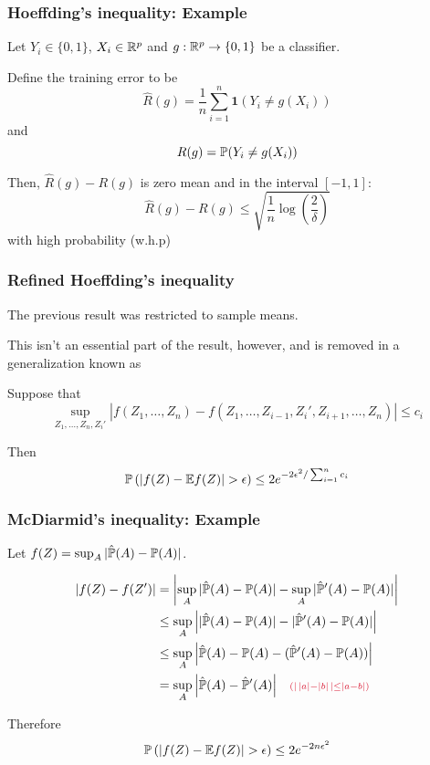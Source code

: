 \documentclass[12pt]{beamer}
\newcommand{\parenthetical}[2]{#1  \scriptstyle \alr{( #2)}}
\begin{document}
\begin{frame}[fragile]
\frametitle{Hoeffding's inequality: Example}
Let $Y_i \in \{0,1\}$, $X_i \in \R^p$ and $g:\R^p \rightarrow \{0,1\}$ be a classifier.
\vsp

Define the training error to be
\[
\hat{R}(g) = \frac{1}{n} \sum_{i=1}^n \mathbf{1}(Y_i \neq g(X_i))
\]
and 
\[
R(g) = \P (Y_i \neq g(X_i))
\]

Then, $\hat{R}(g) - R(g)$ is zero mean and in the interval $[-1,1]$:
\[
\hat{R}(g) - R(g) \leq \sqrt{\frac{1}{n}\log\left(\frac{2}{\delta}\right)}
\]
with high probability (w.h.p)
\end{frame}

\begin{frame}[fragile]
\frametitle{Refined Hoeffding's inequality}
The previous result was restricted to sample means.  

\vsp
This isn't an essential part of the result, however, and is removed in a generalization
known as 

\vsp
Suppose that%
\[
\sup_{Z_1,\ldots,Z_n,Z_i'} \left| f(Z_1,\ldots,Z_n) - f(Z_1,\ldots,Z_{i-1},Z_i',Z_{i+1},\ldots,Z_n) \right| \leq c_i
\]

Then
\[
\P\left( |f(Z) - \E f(Z)| > \epsilon\right) \leq 2e^{-2\epsilon^2/\sum_{i=1}^nc_i}
\]

\end{frame}

\begin{frame}[fragile]
\frametitle{McDiarmid's inequality: Example}
Let $f(Z) = \sup_A|\hat \P(A) - \P(A)|$.  

\begin{align*}
|f(Z) - f(Z') |
& = 
\left|\sup_A|\hat \P(A) - \P(A)|   - \sup_A|\hat \P'(A) - \P(A)| \right| \\
& \leq 
\sup_A\left||\hat \P(A) - \P(A)|   - |\hat \P'(A) - \P(A)| \right| \\
& \leq
\sup_A\left| \hat \P(A) - \P(A)- (\hat \P'(A) - \P(A)) \right| \\
& =
\sup_A\left| \hat \P(A) - \hat \P'(A) \right|  \parenthetical{\quad}{| \,|a| - |b|\,|\leq |a - b|}
\end{align*}

\vsp
Therefore
\[
\P\left( |f(Z) - \E f(Z)| > \epsilon\right) \leq 2e^{-2n\epsilon^2}
\]

\end{frame}
\end{document}
